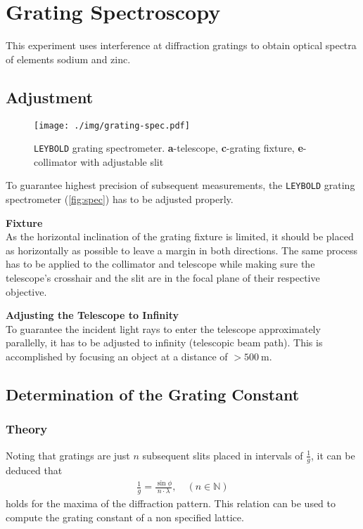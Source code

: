 \chapter{Grating Spectroscopy}
This experiment uses interference at diffraction gratings to obtain optical spectra of elements sodium and zinc.

\section{Adjustment}
\begin{figure}
	\centering
	\texttt{[image: ./img/grating-spec.pdf]}
	\caption[\texttt{LEYBOLD} grating spectrometer]{\texttt{LEYBOLD} grating spectrometer. \textbf{a}-telescope, \textbf{c}-grating fixture, \textbf{e}-collimator with adjustable slit}
	\label{fig:spec}
\end{figure}
To guarantee highest precision of subsequent measurements, the \texttt{LEYBOLD} grating spectrometer (\autoref{fig:spec}) has to be adjusted properly.

\textbf{Fixture}\\
As the horizontal inclination of the grating fixture is limited, it should be placed as horizontally as possible to leave a margin in both directions.
The same process has to be applied to the collimator and telescope while making sure the telescope's crosshair and the slit are in the focal plane of their respective objective.

\textbf{Adjusting the Telescope to Infinity}\\
To guarantee the incident light rays to enter the telescope approximately parallelly, it has to be adjusted to infinity (telescopic beam path).
This is accomplished by focusing an object at a distance of $>\SI{500}{\meter}$.

\section{Determination of the Grating Constant}\label{sec:grating}
\subsection{Theory}
Noting that gratings are just $n$ subsequent slits placed in intervals of $\frac{1}{g}$, it can be deduced that
\begin{align}
	\frac{1}{g}=\frac{\sin\phi}{n\cdot\lambda},\quad(n\in\mathbb{N}) \label{eq:grating-const}
\end{align}
holds for the maxima of the diffraction pattern.
This relation can be used to compute the grating constant of a non specified lattice.
